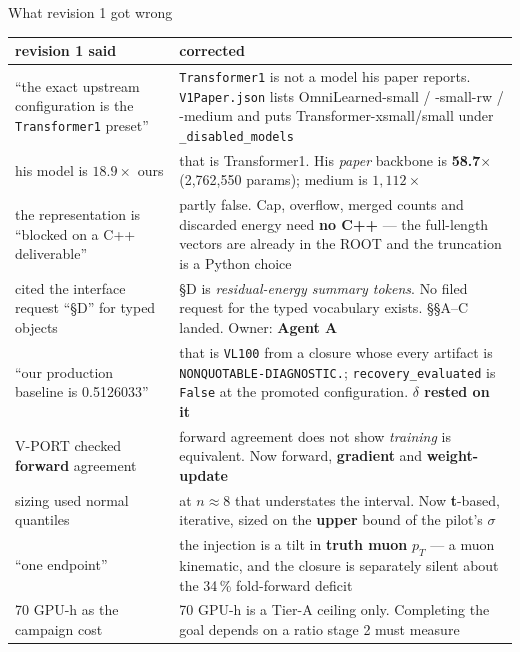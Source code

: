 \documentclass[aspectratio=169,10pt]{beamer}
\newcommand{\warn}[1]{\textcolor{warn}{#1}}
\begin{document}
\begin{frame}[t]{What revision 1 got wrong}
  \vspace{0.3em}
  \begin{center}\scriptsize
  \begin{tabular}{@{}R{0.40\textwidth}R{0.55\textwidth}@{}}
    \toprule
    \textbf{revision 1 said} & \textbf{corrected} \\
    \midrule
    ``the exact upstream configuration is the \texttt{Transformer1} preset'' &
      \warn{\texttt{Transformer1} is not a model his paper reports.}
      \texttt{V1Paper.json} lists OmniLearned-small / -small-rw / -medium and puts
      Transformer-xsmall/small under \texttt{\_disabled\_models} \\
    his model is $18.9\times$ ours &
      that is Transformer1. His \emph{paper} backbone is \textbf{58.7$\times$}
      (2{,}762{,}550 params); medium is $1{,}112\times$ \\
    the representation is ``blocked on a C++ deliverable'' &
      \warn{partly false.} Cap, overflow, merged counts and discarded energy need
      \textbf{no C++} --- the full-length vectors are already in the ROOT and the
      truncation is a Python choice \\
    cited the interface request ``\S D'' for typed objects &
      \S D is \emph{residual-energy summary tokens}. \warn{No filed request for the typed
      vocabulary exists.} \S\S A--C landed. Owner: \textbf{Agent A} \\
    ``our production baseline is 0.5126033'' &
      that is \texttt{VL100} from a closure whose every artifact is
      \texttt{NONQUOTABLE-DIAGNOSTIC.}; \warn{\texttt{recovery\_evaluated} is
      \texttt{False} at the promoted configuration.} \textbf{$\delta$ rested on it} \\
    V-PORT checked \textbf{forward} agreement &
      forward agreement does not show \emph{training} is equivalent. Now forward,
      \textbf{gradient} and \textbf{weight-update} \\
    sizing used normal quantiles &
      at $n\approx8$ that understates the interval. Now \textbf{t}-based, iterative,
      sized on the \textbf{upper} bound of the pilot's $\sigma$ \\
    ``one endpoint'' &
      the injection is a tilt in \textbf{truth muon} $p_T$ --- \warn{a muon kinematic},
      and the closure is separately \warn{silent about the 34\,\% fold-forward deficit} \\
    70 GPU-h as the campaign cost &
      \warn{70 GPU-h is a Tier-A ceiling only.} Completing the goal depends on a ratio
      stage 2 must measure \\
    \bottomrule
  \end{tabular}
  \end{center}
\end{frame}
\end{document}
